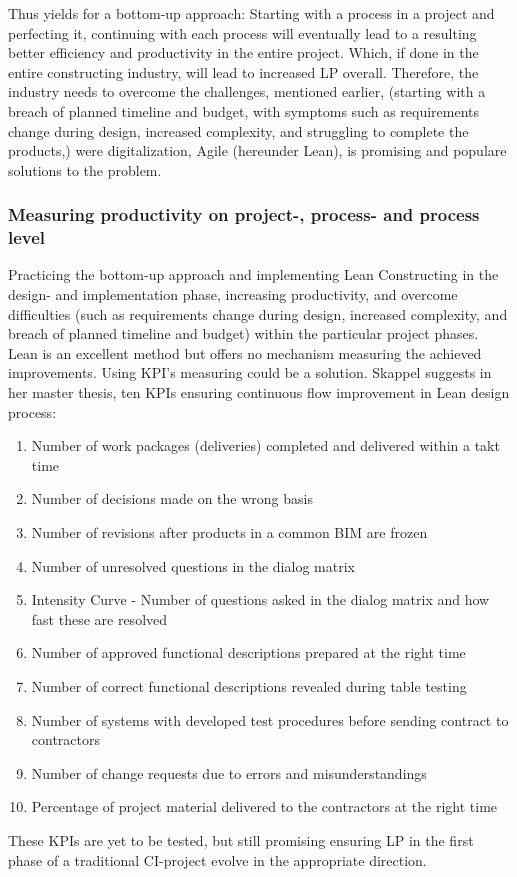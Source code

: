 Thus yields for a bottom-up approach: Starting with a process in a project and perfecting it, continuing with each process will eventually lead to a resulting better efficiency and productivity in the entire project.  Which, if done in the entire constructing industry, will lead to increased LP overall. Therefore, the industry needs to overcome the challenges, mentioned earlier, (starting with a breach of planned timeline and budget, with symptoms such as requirements change during design, increased complexity, and struggling to complete the products,) were digitalization, Agile (hereunder Lean), is promising and populare solutions to the problem. 

\subsubsection{Measuring productivity on project-, process- and process level}
Practicing the bottom-up approach and implementing Lean Constructing in the design- and implementation phase, increasing productivity, and overcome difficulties (such as requirements change during design, increased complexity, and breach of planned timeline and budget) within the particular project phases. Lean is an excellent method but offers no mechanism measuring the achieved improvements. Using KPI's measuring could be a solution. Skappel \cite{KPIs_in_lean} suggests in her master thesis, ten KPIs ensuring continuous flow improvement in Lean design process: 
\begin{enumerate}
    \item Number of work packages (deliveries) completed and delivered within a takt time
    \item  Number of decisions made on the wrong basis
    \item  Number of revisions after products in a common BIM are frozen
    \item  Number of unresolved questions in the dialog matrix
    \item  Intensity Curve - Number of questions asked in the dialog matrix and how fast these are
    resolved
    \item  Number of approved functional descriptions prepared at the right time
    \item  Number of correct functional descriptions revealed during table testing
    \item  Number of systems with developed test procedures before sending contract to contractors
    \item  Number of change requests due to errors and misunderstandings
    \item  Percentage of project material delivered to the contractors at the right time
\end{enumerate}
These KPIs are yet to be tested, but still promising ensuring LP in the first phase of a traditional CI-project evolve in the appropriate direction. 

